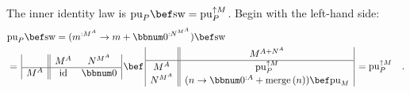 The inner identity law is $\text{pu}_{P}\bef\text{sw}=\text{pu}_{P}^{\uparrow M}$.
Begin with the left-hand side:
\begin{align*}
 & \text{pu}_{P}\bef\text{sw}=(m^{:M^{A}}\rightarrow m+\bbnum 0^{:N^{M^{A}}})\bef\text{sw}\\
 & =\,\begin{array}{|c||cc|}
 & M^{A} & N^{M^{A}}\\
\hline M^{A} & \text{id} & \bbnum 0
\end{array}\,\bef\,\begin{array}{|c||c|}
 & M^{A+N^{A}}\\
\hline M^{A} & \text{pu}_{P}^{\uparrow M}\\
N^{M^{A}} & (n\rightarrow\bbnum 0^{:A}+\text{merge}\,(n))\bef\text{pu}_{M}
\end{array}\,=\text{pu}_{P}^{\uparrow M}\quad.
\end{align*}

